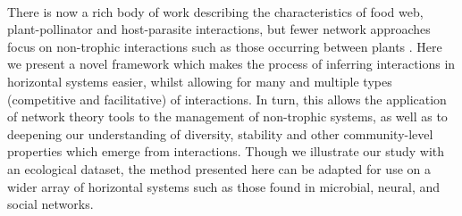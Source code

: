 \documentclass[a4,12pt]{article}
\begin{document}
    \paragraph{} 
    There is now a rich body of work describing the characteristics of food web, plant-pollinator and host-parasite interactions, but fewer network approaches focus on non-trophic interactions such as those occurring between plants \parencite{Ellison2019}. Here we present a novel framework which makes the process of inferring  interactions in horizontal systems easier, whilst allowing for many and multiple types (competitive and facilitative) of interactions. In turn, this allows the application of  network theory tools to the management of non-trophic systems, as well as to deepening our understanding of diversity, stability and other community-level properties which emerge from interactions. Though we illustrate our study with an ecological dataset, the method presented here can be adapted for use on a wider array of  horizontal systems such as those found in microbial, neural, and social networks. 

\end{document}
